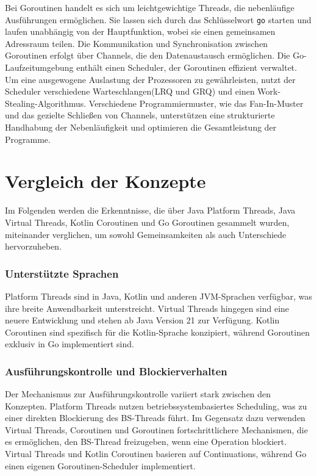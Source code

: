 \documentclass[fontsize=12pt,paper=a4,twoside=semi,parskip=half-,headsepline,headinclude]{scrreprt}
\begin{document}
Bei Goroutinen handelt es sich um leichtgewichtige Threads, die nebenläufige Ausführungen ermöglichen. Sie lassen sich durch das Schlüsselwort \texttt{go} starten und laufen unabhängig von der Hauptfunktion, wobei sie einen gemeinsamen Adressraum teilen. Die Kommunikation und Synchronisation zwischen Goroutinen erfolgt über Channels, die den Datenaustausch ermöglichen. Die Go-Laufzeitumgebung enthält einen Scheduler, der Goroutinen effizient verwaltet. Um eine ausgewogene Auslastung der Prozessoren zu gewährleisten, nutzt der Scheduler verschiedene Warteschlangen(LRQ und GRQ) und einen Work-Stealing-Algorithmus. Verschiedene Programmiermuster, wie das Fan-In-Muster und das gezielte Schließen von Channels, unterstützen eine strukturierte Handhabung der Nebenläufigkeit und optimieren die Gesamtleistung der Programme.

\section{Vergleich der Konzepte}

Im Folgenden werden die Erkenntnisse, die über Java Platform Threads, Java Virtual Threads, Kotlin Coroutinen und Go Goroutinen gesammelt wurden, miteinander verglichen, um sowohl Gemeinsamkeiten als auch Unterschiede hervorzuheben.

\subsubsection{Unterstützte Sprachen}

Platform Threads sind in Java, Kotlin und anderen JVM-Sprachen verfügbar, was ihre breite Anwendbarkeit unterstreicht. Virtual Threads hingegen sind eine neuere Entwicklung und stehen ab Java Version 21 zur Verfügung. Kotlin Coroutinen sind spezifisch für die Kotlin-Sprache konzipiert, während Goroutinen exklusiv in Go implementiert sind.

\subsubsection{Ausführungskontrolle und Blockierverhalten}

Der Mechanismus zur Ausführungskontrolle variiert stark zwischen den Konzepten. Platform Threads nutzen betriebssystembasiertes Scheduling, was zu einer direkten Blockierung des BS-Threads führt. Im Gegensatz dazu verwenden Virtual Threads, Coroutinen und Goroutinen fortschrittlichere Mechanismen, die es ermöglichen, den BS-Thread freizugeben, wenn eine Operation blockiert. Virtual Threads und Kotlin Coroutinen basieren auf Continuations, während Go einen eigenen Goroutinen-Scheduler implementiert.
\end{document}
